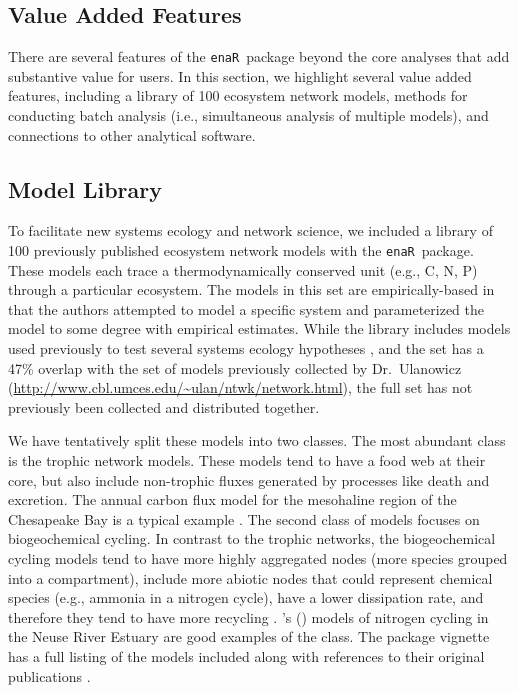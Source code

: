 \documentclass[11pt]{article}
\def\citeapos#1{\citeauthor{#1}'s (\citeyear{#1})}
\newcommand{\enaR}{\texttt{enaR}}
\begin{document}
\begin{spacing}{2}
\section{Value Added Features}
There are several features of the \enaR\ package beyond the core
analyses that add substantive value for users.  In this section, we
highlight several value added features, including a library of 100
ecosystem network models, methods for conducting batch analysis (i.e.,
simultaneous analysis of multiple models), and connections to other
analytical software.

\subsection{Model Library}
To facilitate new systems ecology and network science, we included a
library of 100 previously published ecosystem network models with the
\enaR\ package. These models each trace a thermodynamically conserved
unit (e.g., C, N, P) through a particular ecosystem.  The models in
this set are empirically-based in that the authors attempted to model
a specific system and parameterized the model to some degree with
empirical estimates.  While the library includes models used previously to
test several systems ecology hypotheses \citep{borrett10_idd,
  borrett10_hmg, salas11_did, borrett13}, and the set has a 47\%
overlap with the set of models previously collected by Dr.\ Ulanowicz
(\url{http://www.cbl.umces.edu/~ulan/ntwk/network.html}), the full
set has not previously been collected and distributed together.

We have tentatively split these models into two classes.  The most
abundant class is the trophic network models. %
These models tend to have a food web at their core, but also include
non-trophic fluxes generated by processes like death and excretion.
The annual carbon flux model for the mesohaline region of the
Chesapeake Bay is a typical example \citep{baird89}.  The second class
of models focuses on biogeochemical cycling.  %
In contrast to the trophic networks, the biogeochemical cycling models
tend to have more highly aggregated nodes (more species grouped into a
compartment), include more abiotic nodes that could represent chemical
species (e.g., ammonia in a nitrogen cycle), have a lower dissipation
rate, and therefore they tend to have more recycling
\citep{christian96, borrett10_idd}.  \citeapos{christian03} models of
nitrogen cycling in the Neuse River Estuary are good examples of the
class.  The package vignette has a full listing of the models included
along with references to their original publications \citep{enar}.


\end{spacing}
\end{document}

